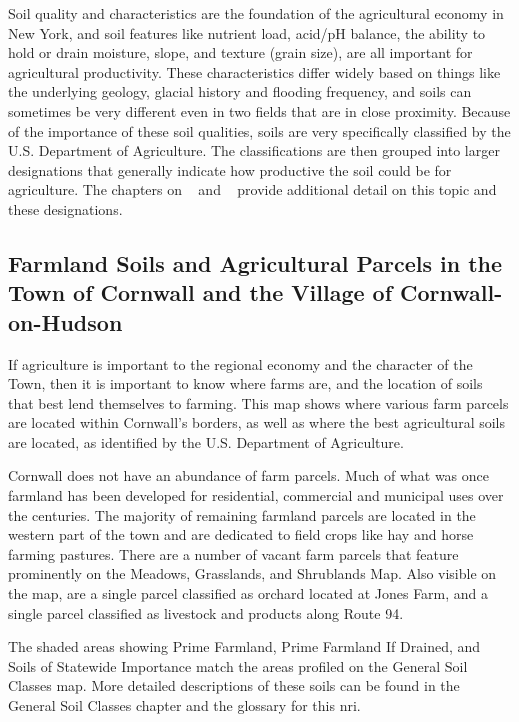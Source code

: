 Soil quality and characteristics are the foundation of the agricultural economy 
in New York, and soil features like nutrient load, acid/pH balance, the ability 
to hold or drain moisture, slope, and texture (grain size), are all important 
for agricultural productivity. These characteristics differ widely based on 
things like the underlying geology, glacial history and flooding frequency, and 
soils can sometimes be very different even in two fields that are in close 
proximity. Because of the importance of these soil qualities, soils are very 
specifically classified by the U.S. Department of Agriculture. The 
classifications are then grouped into larger designations that generally 
indicate how productive the soil could be for agriculture. The chapters on 
~ and ~ provide additional 
detail on this topic and these designations.

\subsection*{Farmland Soils and Agricultural Parcels in the Town of Cornwall 
and the Village of Cornwall-on-Hudson}
If agriculture is important to the regional economy and the character of the 
Town, then it is important to know where farms are, and the location of soils 
that best lend themselves to farming. This map shows where various farm parcels 
are located within Cornwall’s borders, as well as where the best agricultural 
soils are located, as identified by the U.S. Department of Agriculture. 

Cornwall does not have an abundance of farm parcels. Much of what was once 
farmland has been developed for residential, commercial and municipal uses over 
the centuries. The majority of remaining farmland parcels are located in the 
western part of the town and are dedicated to field crops like hay and horse 
farming pastures. There are a number of vacant farm parcels that feature 
prominently on the Meadows, Grasslands, and Shrublands Map. Also visible on the 
map, are a single parcel classified as orchard located at Jones Farm, and a 
single parcel classified as livestock and products along Route 94. 

The shaded areas showing Prime Farmland, Prime Farmland If Drained, and Soils 
of Statewide Importance match the areas profiled on the General Soil Classes 
map. More detailed descriptions of these soils can be found in the General Soil 
Classes chapter and the glossary for this \gls{nri}.


